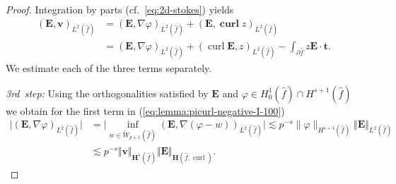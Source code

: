 \documentclass{article}
\begin{document}
\begin{proof}
Integration by parts (cf.~\eqref{eq:2d-stokes}) yields 
\begin{align}
\label{eq:lemma:picurl-negative-I-100}
({\mathbf{E}},{\mathbf{v}})_{L^{2}(\widehat{f})}&=
({\mathbf{E}},\nabla \varphi)_{L^{2}(\widehat{f})}+({\mathbf{E}},\operatorname{\mathbf{curl}}z)_{L^{2}(\widehat{f})} \\
\nonumber 
 &= 
({\mathbf{E}},\nabla \varphi)_{L^{2}(\widehat{f})}
+ (\operatorname{curl}{\mathbf{E}},z)_{L^{2}(\widehat{f})}-\int_{\partial \widehat{f}}z{\mathbf{E}%
}\cdot{\mathbf{t}}. 
\end{align}
We estimate each of the three terms separately.

\emph{3rd~step:} Using the orthogonalities satisfied by ${\mathbf{E}}$ and
$\varphi\in H_{0}^{1}(\widehat{f})\cap H^{s+1}(\widehat{f})$ we obtain
for the first term in (\ref{eq:lemma:picurl-negative-I-100})
\begin{align*}
\bigl| 
({\mathbf{E}},\nabla\varphi)_{L^{2}(\widehat{f})}\bigr|
&=
\bigl| \inf_{w\in\mathring{W}_{p+1}%
(\widehat{f})}({\mathbf{E}},\nabla(\varphi-w))_{L^{2}(\widehat{f})} \bigr|
\lesssim p^{-s}
\|\varphi\|_{H^{s+1}(\widehat f)} 
\Vert{\mathbf{E}}\Vert
_{L^{2}(\widehat{f})}\\
& \lesssim p^{-s}\Vert
{\mathbf{v}}\Vert_{\mathbf{H}^s(\widehat{f})}\Vert{\mathbf{E}}\Vert
_{\mathbf{H}(\widehat{f},\operatorname*{curl})}.
\end{align*}


\end{proof}
\end{document}
